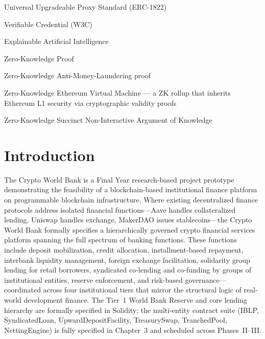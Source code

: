 \documentclass[12pt,a4paper]{report}
\begin{document}
\begin{description}[leftmargin=0pt]
    \item[UUPS:] Universal Upgradeable Proxy Standard (ERC-1822)
    \item[VC:] Verifiable Credential (W3C)
    \item[XAI:] Explainable Artificial Intelligence
    \item[ZKP:] Zero-Knowledge Proof
    \item[zkAML:] Zero-Knowledge Anti-Money-Laundering proof
    \item[zkEVM:] Zero-Knowledge Ethereum Virtual Machine --- a ZK rollup that inherits Ethereum L1 security via cryptographic validity proofs
    \item[zk-SNARK:] Zero-Knowledge Succinct Non-Interactive Argument of Knowledge
\end{description}
\newpage
{}
\setcounter{page}{1}


\chapter{Introduction}
\label{sec:intro}

The Crypto World Bank is a Final Year research-based project prototype demonstrating the feasibility of a blockchain-based institutional finance platform on programmable blockchain infrastructure. Where existing decentralized finance protocols address isolated financial functions---Aave handles collateralized lending, Uniswap handles exchange, MakerDAO issues stablecoins---the Crypto World Bank formally specifies a hierarchically governed crypto financial services platform spanning the full spectrum of banking functions. These functions include deposit mobilization, credit allocation, installment-based repayment, interbank liquidity management, foreign exchange facilitation, solidarity group lending for retail borrowers, syndicated co-lending and co-funding by groups of institutional entities, reserve enforcement, and risk-based governance---coordinated across four institutional tiers that mirror the structural logic of real-world development finance. The Tier~1 World Bank Reserve and core lending hierarchy are formally specified in Solidity; the multi-entity contract suite (IBLP, SyndicatedLoan, UpwardDepositFacility, TreasurySwap, TranchedPool, NettingEngine) is fully specified in Chapter~3 and scheduled across Phases~II--III.
\end{document}
